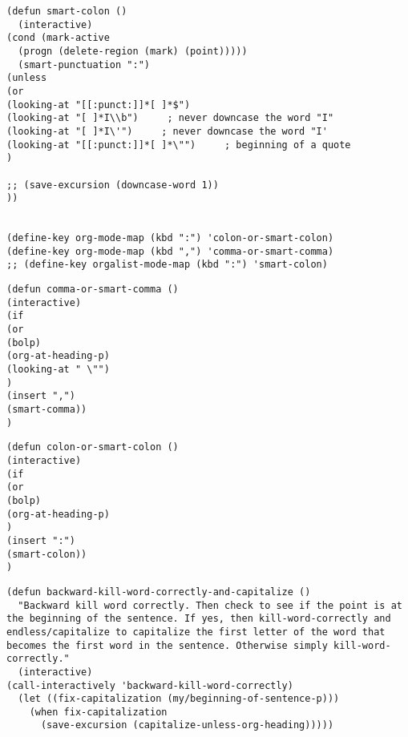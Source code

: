 \documentclass[11pt]{article}
\begin{document}
\label{sec:org50ed3af}

\begin{verbatim}
(defun smart-colon ()
  (interactive)
(cond (mark-active
  (progn (delete-region (mark) (point))))) 
  (smart-punctuation ":")
(unless
(or
(looking-at "[[:punct:]]*[ ]*$")
(looking-at "[ ]*I\\b")     ; never downcase the word "I"
(looking-at "[ ]*I\'")     ; never downcase the word "I'
(looking-at "[[:punct:]]*[ ]*\"")     ; beginning of a quote
)

;; (save-excursion (downcase-word 1))
))


(define-key org-mode-map (kbd ":") 'colon-or-smart-colon)
(define-key org-mode-map (kbd ",") 'comma-or-smart-comma)
;; (define-key orgalist-mode-map (kbd ":") 'smart-colon) 
\end{verbatim}

\label{sec:orge15d4b6}
\begin{verbatim}
(defun comma-or-smart-comma ()
(interactive) 
(if 
(or
(bolp)
(org-at-heading-p)
(looking-at " \"")
) 
(insert ",")
(smart-comma))
) 
\end{verbatim}

\label{sec:org13d332c}
\begin{verbatim}
(defun colon-or-smart-colon ()
(interactive)
(if
(or
(bolp)
(org-at-heading-p)
)
(insert ":")
(smart-colon))
)
\end{verbatim}
\label{sec:orgf08384a}
\begin{verbatim}
(defun backward-kill-word-correctly-and-capitalize ()
  "Backward kill word correctly. Then check to see if the point is at the beginning of the sentence. If yes, then kill-word-correctly and endless/capitalize to capitalize the first letter of the word that becomes the first word in the sentence. Otherwise simply kill-word-correctly."
  (interactive)
(call-interactively 'backward-kill-word-correctly)
  (let ((fix-capitalization (my/beginning-of-sentence-p)))
    (when fix-capitalization
      (save-excursion (capitalize-unless-org-heading)))))
\end{verbatim}
\end{document}
